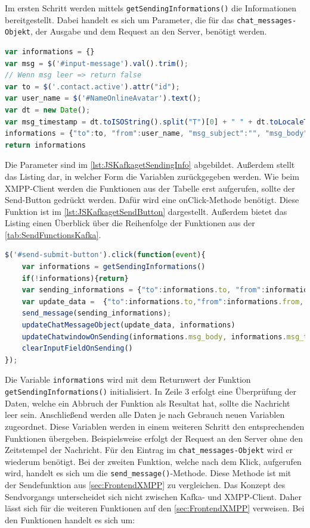 \documentclass[a4paper,titlepage,halfparskip,12pt]{scrreprt}
\begin{document}
\begin{onehalfspacing}
Im ersten Schritt werden mittels \texttt{getSendingInformations()} die Informationen bereitgestellt. Dabei handelt es sich um Parameter, die für das \texttt{chat\_messages-Objekt}, der Ausgabe und dem Request an den Server, benötigt werden.
\begin{lstlisting}[language=Javascript,caption=\texttt{getSendingInformations()},label={lst:JSKafkagetSendingInfo}]
var informations = {}
var msg = $('#input-message').val().trim();
// Wenn msg leer => return false
var to = $('.contact.active').attr("id");
var user_name = $('#NameOnlineAvatar').text();
var dt = new Date();
var msg_timestamp = dt.toISOString().split("T")[0] + " " + dt.toLocaleTimeString().substring(0,5);
informations = {"to":to, "from":user_name, "msg_subject":"", "msg_body":msg,"msg_type":"chat", "msg_timestamp":msg_timestamp}
return informations
\end{lstlisting}
Die Parameter sind im \autoref{lst:JSKafkagetSendingInfo} abgebildet. Außerdem stellt das Listing dar, in welcher Form die Variablen zurückgegeben werden. Wie beim XMPP-Client werden die Funktionen aus der Tabelle erst aufgerufen, sollte der Send-Button gedrückt werden. Dafür wird eine \dq onClick\dq-Methode benötigt. Diese Funktion ist im \autoref{lst:JSKafkagetSendButton} dargestellt. Außerdem bietet das Listing einen Überblick über die Reihenfolge der Funktionen aus der \autoref{tab:SendFunctionsKafka}.
\begin{lstlisting}[language=Javascript,caption=Verknüpfte Funktion mit dem HTML-Element,label={lst:JSKafkagetSendButton}]
$('#send-submit-button').click(function(event){
	var informations = getSendingInformations()
	if(!informations){return}
	var sending_informations = {"to":informations.to, "from":informations.from, "msg_subject":informations.msg_subject, "msg_body":informations.msg_body,"msg_type":"chat"}
	var update_data =  {"to":informations.to,"from":informations.from, "msg_body":informations.msg_body, "msg_timestamp":informations.msg_timestamp}
	send_message(sending_informations);
	updateChatMessageObject(update_data, informations)
	updateChatwindowOnSending(informations.msg_body, informations.msg_timestamp)
	clearInputFieldOnSending()
});
\end{lstlisting}
Die Variable \texttt{informations} wird mit dem Returnwert der Funktion \texttt{getSendingInformations()} initialisiert. In Zeile 3 erfolgt eine Überprüfung der Daten, welche ein Abbruch der Funktion als Resultat hat, sollte die Nachricht leer sein. Anschließend werden alle Daten je nach Gebrauch neuen Variablen zugeordnet. Diese Variablen werden in einem weiteren Schritt den entsprechenden Funktionen übergeben. Beispielsweise erfolgt der Request an den Server ohne den Zeitstempel der Nachricht. Für den Eintrag im \texttt{chat\_messages-Objekt} wird er wiederum benötigt. Bei der zweiten Funktion, welche nach dem Klick, aufgerufen wird, handelt es sich um die \texttt{send\_message()}-Methode. Diese Methode ist mit der Sendefunktion aus \autoref{sec:FrontendXMPP} zu vergleichen. Das Konzept des Sendvorgangs unterscheidet sich nicht zwischen Kafka- und XMPP-Client. Daher lässt sich für die weiteren Funktionen auf den \autoref{sec:FrontendXMPP} verweisen. Bei den Funktionen handelt es sich um:

\end{onehalfspacing}
\end{document}

